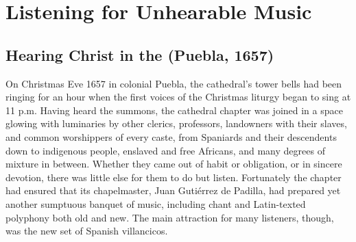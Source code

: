 % 
% 

\chapter{Listening for Unhearable Music}
\label{part:unhearable-music}

\section{Hearing Christ in the  (Puebla, 1657)}
\label{ch:Padilla-Voces}

On Christmas Eve 1657 in colonial Puebla, the cathedral's tower bells had been
ringing for an hour when the first voices of the Christmas liturgy began to sing
at 11 p.m.
Having heard the summons, the cathedral chapter was joined in a space glowing
with luminaries by other clerics, professors, landowners with their slaves, and
common worshippers of every caste, from Spaniards and their descendents down to
indigenous people, enslaved and free Africans, and many degrees of mixture in
between.
Whether they came out of habit or obligation, or in sincere devotion, there was
little else for them to do but listen.
Fortunately the chapter had ensured that its chapelmaster, Juan Gutiérrez de
Padilla, had prepared yet another sumptuous banquet of music, including chant
and Latin-texted polyphony both old and new.
The main attraction for many listeners, though, was the new set of Spanish
villancicos.

